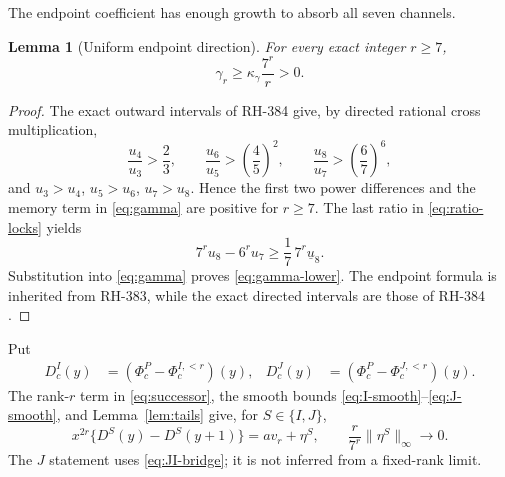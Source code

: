 \documentclass[11pt]{article}
\newtheorem{lemma}[theorem]{Lemma}
\theoremstyle{definition}
\theoremstyle{remark}
\newcommand{\PhiP}{\Phi^{P}}
\newcommand{\PhiI}{\Phi^{I,<r}}
\newcommand{\PhiJ}{\Phi^{J,<r}}
\begin{document}
The endpoint coefficient has enough growth to absorb all seven
channels.

\begin{lemma}[Uniform endpoint direction]
\label{lem:gamma}
For every exact integer $r\ge7$,
\begin{equation}
 \gamma_r\ge\kappa_\gamma\frac{7^r}{r}>0.
 \label{eq:gamma-lower}
\end{equation}
\end{lemma}

\begin{proof}
The exact outward intervals of RH-384 give, by directed rational cross
multiplication,
\begin{equation}
 \frac{u_4}{u_3}>\frac23,
 \qquad \frac{u_6}{u_5}>\left(\frac45\right)^2,
 \qquad \frac{u_8}{u_7}>\left(\frac67\right)^6,
 \label{eq:ratio-locks}
\end{equation}
and $u_3>u_4$, $u_5>u_6$, $u_7>u_8$.  Hence the first two power
differences and the memory term in \eqref{eq:gamma} are positive for
$r\ge7$.  The last ratio in \eqref{eq:ratio-locks} yields
\[
 7^ru_8-6^ru_7\ge\frac17\,7^r\underline u_8.
\]
Substitution into \eqref{eq:gamma} proves \eqref{eq:gamma-lower}.
The endpoint formula is inherited from RH-383, while the exact directed
intervals are those of RH-384 \cite{RH383,RH384}.
\end{proof}

Put
\begin{align*}
 D^I_c(y)&=(\PhiP_c-\PhiI_c)(y),&
 D^J_c(y)&=(\PhiP_c-\PhiJ_c)(y).
\end{align*}
The rank-$r$ term in \eqref{eq:successor}, the smooth bounds
\eqref{eq:I-smooth}--\eqref{eq:J-smooth}, and
Lemma~\ref{lem:tails} give, for $S\in\{I,J\}$,
\begin{equation}
 x^{2r}\{D^S(y)-D^S(y+1)\}=a v_r+\eta^S,
 \qquad
 \frac{r}{7^r}\|\eta^S\|_\infty\longrightarrow0.
 \label{eq:coordinate-jump}
\end{equation}
The $J$ statement uses \eqref{eq:JI-bridge}; it is not inferred from a
fixed-rank limit.
\end{document}
